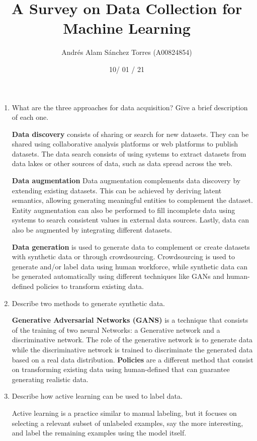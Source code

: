 \documentclass[]{article}
\title{\textbf{A Survey on Data Collection for Machine Learning}}
\date{\small 10/ 01 / 21}
\author{Andrés Alam Sánchez Torres (A00824854)}
\begin{document}
\maketitle

\begin{enumerate}
    \item What are the three approaches for data acquisition? Give a brief description of each one.

    \textbf{Data discovery}  consists of sharing or search for new datasets. They can be shared using 
    collaborative analysis platforms or web platforms to publish datasets. The data search consists of using 
    systems to extract datasets from data lakes or other sources of data, such as data spread across the web.\par
    \textbf{Data augmentation} Data augmentation complements data discovery by extending existing datasets. This 
    can be achieved by deriving latent semantics, allowing generating meaningful entities to complement the 
    dataset. Entity augmentation can also be performed to fill incomplete data using systems to search consistent 
    values in external data sources. Lastly, data can also be augmented by integrating different datasets. \par
    \textbf{Data generation} is used to generate data to complement or create datasets with synthetic data or through 
    crowdsourcing. Crowdsourcing is used to generate and/or label data using human workforce, while synthetic data
    can be generated automatically using different techniques like GANs and human-defined policies to transform 
    existing data.


    \item Describe two methods to generate synthetic data.
    
    \textbf{Generative Adversarial Networks (GANS)} is a technique that consists of the training of two neural Networks: a Generative
    network and a discriminative network. The role of the generative network is to generate data while the discriminative
    network is trained to discriminate the generated data based on a real data distribution. \textbf{Policies} are a different method that 
    consist on transforming existing data using human-defined that can guarantee generating realistic data.

    \item Describe how active learning can be used to label data.
    
    Active learning is a practice similar to manual labeling, but it focuses on selecting a relevant subset of unlabeled 
    examples, say the more interesting, and label the remaining examples using the model itself.


\end{enumerate}
\end{document}
